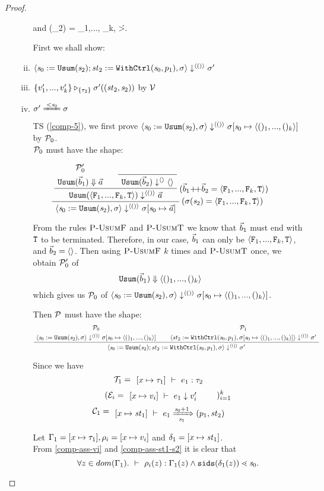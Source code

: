 \begin{proof}
\begin{itemize}
\begin{enumerate}[(i)]
    and 
    {\sgm(\s_2) = \< \F_1,..., \F_k, \T \'>.}
    


	First we shall show: 
	\item \label{comp-5}$\seval{\sdef{\s_0}{\usum(\s_2)}; \withctrl{\s_0}{p_1}{\st_2}}{\sgm}{\singl{()}}{\sgm'}$
	\item $\ValRep{\Seqk{v'}}{\tseq{\tau_2}}{\sgm'((\st_2,\s_2))}$ by $\MV$
	\item $\sgm' \ConEq{\s_0} \sgm$ \\

\def\usumdef{\sdef{\s_0}{\usum(\s_2)}} 

	TS (\ref{comp-5}), we first prove 
	$\seval{\sdef{\s_0}{\usum(\s_2)}} {\sgm} {\singl{()}} {\sgmsz}$ by $\MP_0$. \\
	$\MP_0$ must have the shape: 
	
	$$\PT{
		\UCN{\MP_0'}{\blockf{\usum}{\b_1}{\a}}
		\Axiom{\sevalfg{\usum}{\b_2}{\emptyv} \emptyv}
		\RiLa{(\b_1 {\++} \b_2 = \stwo)}
		\BC{\sevalfg{\usum}{\stwo}{\vunit}{\a}}
		\RiLa{(\sgm(\s_2) = \stwo)}
		\UC{\seval{\usumdef}{\sgm}{\vunit}{\sgm[\s_0 \|-> \a]}}
	}$$
	
	From the rules $\PName{UsumF}$ and $\PName{UsumT}$ we know that $\b_1$ must end with $\T$ to be terminated. 
	Therefore, in our case, $\b_1$ can only be $\stwo$, and $\b_2 = \emptyv$.
	Then using $\PName{UsumF}$ $k$ times and $\PName{UsumT}$ once, we obtain
	$\MP_0'$ of 
		$$\PT{\AC{\blockf{\usum}{\b_1}{\kunit}}}$$ 
	which gives us 
	$\MP_0$ of $ \seval{\sdef{\s_0}{\usum(\s_2)}} {\sgm} {\singl{()}}
	{\sgmsz}$.
	
	Then $\MP$ must have the shape:
	$$ \PT{
		\UCN{\MP_0}{\seval{\sdef{\s_0}{\usum(\s_2)}}{\sgm}{\singl{()}}{\sgm[\s_0 \|-> \vrange{()_1}{()_k}]}}
		\UCN{\MP_1}{\seval{\withctrl{\s_0}{p_1}{\st_2}}{\sgm[\s_0 \|-> \vrange{()_1}{()_k}]}{\<()\'>}{\sgm'}}
		\BC{\seval{\sdef{\s_0}{\usum(\s_2)}; \withctrl{\s_0}{p_1}{\st_2}}{\sgm}{\singl{()}}{\sgm'}}
	} $$
	
	Since we have 
	$$\MT_1 = \PT{\AC{\Type{[x \|-> {\tau_1}]}{e_1}{\tau_2}}}$$
	$$(\ME_i = \PT{\AC{\Eval{[x \|-> {v_i}]}{e_1}{v_i'}}})^k_{i=1} $$
	$$\MC_1 = \PT{\AC{\Trans{[x \|-> {\st_1}]}{e_1}{\s_0+1}{\s_1}{\sfun{p_1}{\st_2}}}}$$
	
	Let $\Gam_1 = [x \|-> \tau_1], \rho_i= [x \|-> v_i]$ and $\del_1 = [x \|-> \st_1]$. \\
	From \eqref{comp-ass-vi} and \eqref{comp-ass-st1-s2} it is clear that 
	$$\forall z \in dom(\Gam_1). \Type{}{\rho_i(z)}{\Gam_1(z)} \wedge 
	\sids{\del_1(z)} \.< \s_0 .$$
	

\end{enumerate}
\end{itemize}
\end{proof}
